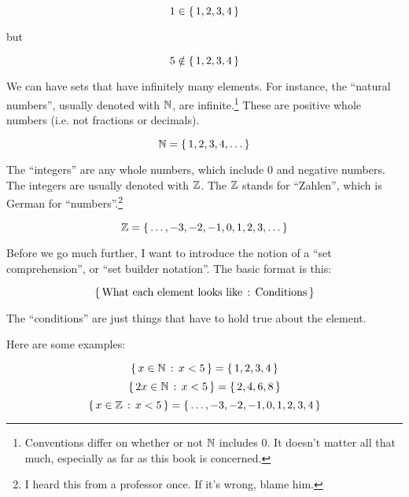 \begin{displaymath}
  1 \in \left\{ \, 1,2,3,4 \, \right\}
\end{displaymath}

but 

\begin{displaymath}
  5 \notin \left\{ \, 1,2,3,4 \, \right\}
\end{displaymath}

We can have sets that have infinitely many elements. For instance, the
``natural numbers'', usually denoted with $\mathbb{N}$, are
infinite.\footnote{Conventions differ on whether or not $\mathbb{N}$ includes
  $0$. It doesn't matter all that much, especially as far as this book
  is concerned.} These are positive whole numbers (i.e. not fractions
or decimals).

\begin{displaymath}
  \mathbb{N} = \left\{ \, 1,2,3,4,\dots \, \right\}
\end{displaymath}

The ``integers'' are any whole numbers, which include $0$ and negative
numbers. The integers are usually denoted with $\mathbb{Z}$. The $\mathbb{Z}$ stands
for ``Zahlen'', which is German for ``numbers''.\footnote{I heard this
  from a professor once. If it's wrong, blame him.}

\begin{displaymath}
  \mathbb{Z} = \left\{ \, \dots, -3, -2, -1, 0, 1, 2, 3, \dots \, \right\}
\end{displaymath}

Before we go much further, I want to introduce the notion of a ``set
comprehension'', or ``set builder notation''. The basic format is this:

\begin{displaymath}
  \left\{ \,  \text{\rmfamily What each element looks like} \, : \, \text{\rmfamily Conditions}  \, \right\}
\end{displaymath}

The ``conditions'' are just things that have to hold true about the
element.

Here are some examples:

\begin{displaymath}
  \left\{ \,  x \in \mathbb{N} \, : \, x < 5  \, \right\} = \left\{ \, 1,2,3,4 \, \right\}
\end{displaymath}
\begin{displaymath}
  \left\{ \,  2x \in \mathbb{N} \, : \, x < 5  \, \right\} = \left\{ \, 2,4,6,8 \, \right\}
\end{displaymath}
\begin{displaymath}
  \left\{ \,  x \in \mathbb{Z} \, : \, x < 5  \, \right\} = \left\{ \, \dots,-3,-2,-1,0,1,2,3,4 \, \right\}
\end{displaymath}

